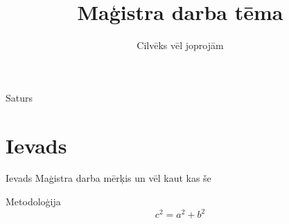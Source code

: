 \documentclass[]{beamer}
\title{Maģistra darba tēma}
\author{Cilvēks vēl joprojām}
\begin{document}
\frame{\titlepage}  

\begin{frame}{Saturs}
  \tableofcontents
\end{frame}

\section{Ievads}
\begin{frame}{Ievads}
Maģistra darba mērķis un vēl kaut kas še  
\end{frame}

\begin{frame}{Metodoloģija}
  \begin{equation}
    c^2 = a^2 + b^2    
  \end{equation}
\end{frame}
\end{document}
